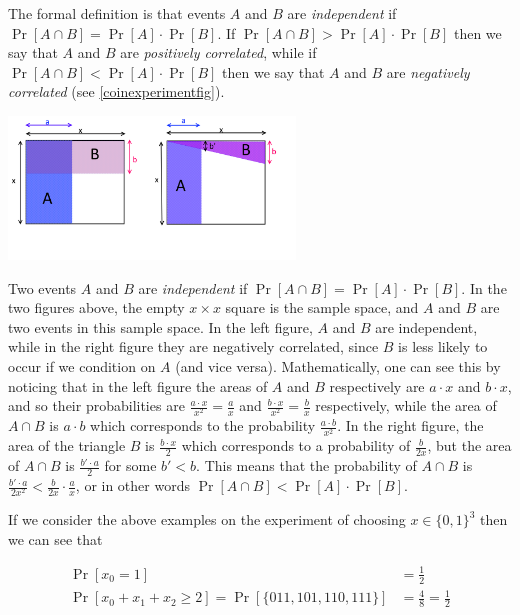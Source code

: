 The formal definition is that events \(A\) and \(B\) are
\emph{independent} if \(\Pr[A \cap B]=\Pr[A] \cdot \Pr[B]\). If
\(\Pr[A \cap B] > \Pr[A]\cdot \Pr[B]\) then we say that \(A\) and \(B\)
are \emph{positively correlated}, while if
\(\Pr[ A \cap B] < \Pr[A] \cdot \Pr[B]\) then we say that \(A\) and
\(B\) are \emph{negatively correlated} (see \cref{coinexperimentfig}).

\begin{marginfigure}
\centering
\includegraphics[width=\linewidth, height=1.5in, keepaspectratio]{../figure/independence.png}
\caption{Two events \(A\) and \(B\) are \emph{independent} if
\(\Pr[A \cap B]=\Pr[A]\cdot \Pr[B]\). In the two figures above, the
empty \(x\times x\) square is the sample space, and \(A\) and \(B\) are
two events in this sample space. In the left figure, \(A\) and \(B\) are
independent, while in the right figure they are negatively correlated,
since \(B\) is less likely to occur if we condition on \(A\) (and vice
versa). Mathematically, one can see this by noticing that in the left
figure the areas of \(A\) and \(B\) respectively are \(a\cdot x\) and
\(b\cdot x\), and so their probabilities are
\(\tfrac{a\cdot x}{x^2}=\tfrac{a}{x}\) and
\(\tfrac{b\cdot x}{x^2}=\tfrac{b}{x}\) respectively, while the area of
\(A \cap B\) is \(a\cdot b\) which corresponds to the probability
\(\tfrac{a\cdot b}{x^2}\). In the right figure, the area of the triangle
\(B\) is \(\tfrac{b\cdot x}{2}\) which corresponds to a probability of
\(\tfrac{b}{2x}\), but the area of \(A \cap B\) is
\(\tfrac{b' \cdot a}{2}\) for some \(b'<b\). This means that the
probability of \(A \cap B\) is
\(\tfrac{b'\cdot a}{2x^2} < \tfrac{b}{2x} \cdot \tfrac{a}{x}\), or in
other words \(\Pr[A \cap B ] < \Pr[A] \cdot \Pr[B]\).}
\label{independencefig}
\end{marginfigure}

If we consider the above examples on the experiment of choosing
\(x\in \{0,1\}^3\) then we can see that

\begin{equation*}

\begin{aligned}
\Pr[x_0=1] &= \tfrac{1}{2} \\
\Pr[x_0+x_1+x_2 \geq 2] = \Pr[\{ 011,101,110,111 \}] &= \tfrac{4}{8} = \tfrac{1}{2}
\end{aligned}

\end{equation*}

